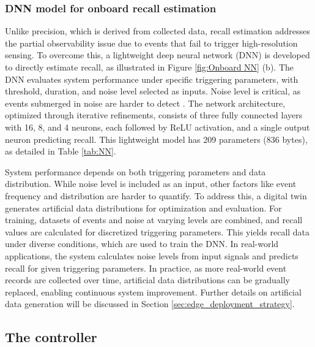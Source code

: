 \documentclass[a4paper,fleqn,numbers,sort&compress]{cas-sc}
\begin{document}
\subsubsection{DNN model for onboard recall estimation}

Unlike precision, which is derived from collected data, recall estimation addresses the partial observability issue due to events that fail to trigger high-resolution sensing. To overcome this, a lightweight deep neural network (DNN) is developed to directly estimate recall, as illustrated in Figure \ref{fig:Onboard NN} (b). The DNN evaluates system performance under specific triggering parameters, with threshold, duration, and noise level selected as inputs. Noise level is critical, as events submerged in noise are harder to detect \citep{han_electrocardiogramsignaldenoising_2017}. The network architecture, optimized through iterative refinements, consists of three fully connected layers with 16, 8, and 4 neurons, each followed by ReLU activation, and a single output neuron predicting recall. This lightweight model has 209 parameters (836 bytes), as detailed in Table \ref{tab:NN}.

System performance depends on both triggering parameters and data distribution. While noise level is included as an input, other factors like event frequency and distribution are harder to quantify. To address this, a digital twin generates artificial data distributions for optimization and evaluation. For training, datasets of events and noise at varying levels are combined, and recall values are calculated for discretized triggering parameters. This yields recall data under diverse conditions, which are used to train the DNN. In real-world applications, the system calculates noise levels from input signals and predicts recall for given triggering parameters. In practice, as more real-world event records are collected over time, artificial data distributions can be gradually replaced, enabling continuous system improvement. Further details on artificial data generation will be discussed in Section \ref{sec:edge_deployment_strategy}.

\subsection{The controller}
\label{component-controller}
\end{document}
